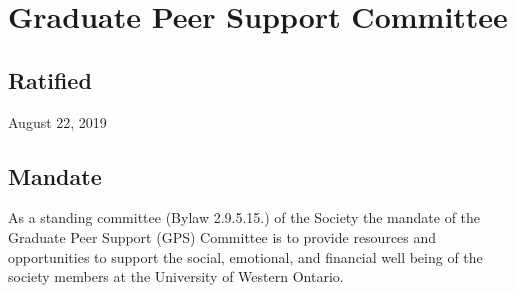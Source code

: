 \section{Graduate Peer Support Committee}

\subsection{Ratified}
August 22, 2019

\subsection{Mandate}
As a standing committee (Bylaw 2.9.5.15.) of the Society the mandate of the Graduate Peer Support (GPS) Committee is to provide resources and opportunities to support the social, emotional, and financial well being of the society members at the University of Western Ontario.


